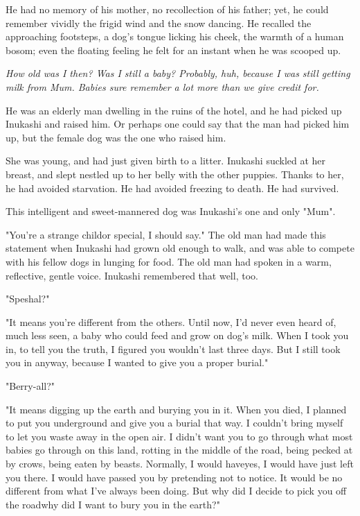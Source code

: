 He had no memory of his mother, no recollection of his father; yet, he
could remember vividly the frigid wind and the snow dancing. He recalled
the approaching footsteps, a dog's tongue licking his cheek, the warmth
of a human bosom; even the floating feeling he felt for an instant when
he was scooped up.

\emph{How old was I then? Was I still a baby? Probably, huh, because I was
still getting milk from Mum. Babies sure remember a lot more than we
give credit for.}

He was an elderly man dwelling in the ruins of the hotel, and he had
picked up Inukashi and raised him. Or perhaps one could say that the man
had picked him up, but the female dog was the one who raised him.

She was young, and had just given birth to a litter. Inukashi suckled at
her breast, and slept nestled up to her belly with the other puppies.
Thanks to her, he had avoided starvation. He had avoided freezing to
death. He had survived.

This intelligent and sweet-mannered dog was Inukashi's one and only
"Mum".

"You're a strange child\el or special, I should say." The old man had
made this statement when Inukashi had grown old enough to walk, and was
able to compete with his fellow dogs in lunging for food. The old man
had spoken in a warm, reflective, gentle voice. Inukashi remembered that
well, too.

"Speshal?"

"It means you're different from the others. Until now, I'd never even
heard of, much less seen, a baby who could feed and grow on dog's milk.
When I took you in, to tell you the truth, I figured you wouldn't last
three days. But I still took you in anyway, because I wanted to give you
a proper burial."

"Berry-all?"

"It means digging up the earth and burying you in it. When you died, I
planned to put you underground and give you a burial that way. I
couldn't bring myself to let you waste away in the open air. I didn't
want you to go through what most babies go through on this land, rotting
in the middle of the road, being pecked at by crows, being eaten by
beasts. Normally, I would have\el yes, I would have just left you there.
I would have passed you by pretending not to notice. It would be no
different from what I've always been doing. But why did I decide to pick
you off the road\el why did I want to bury you in the earth?"

